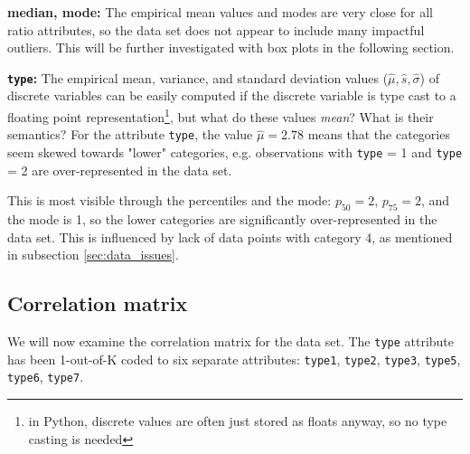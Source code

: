 \textbf{median, mode:} The empirical mean values and modes are very close for all ratio attributes, so the data set does not appear to include many impactful outliers. This will be further investigated with box plots in the following section. 

\textbf{\texttt{type}:} The empirical mean, variance, and standard deviation values ($\hat{\mu}, \hat{s}, \hat{\sigma}$) of discrete variables can be easily computed if the discrete variable is type cast to a floating point representation\footnote{in Python, discrete values are often just stored as floats anyway, so no type casting is needed}, but what do these values \textit{mean}? What is their semantics? For the attribute \texttt{type}, the value $\hat{\mu} = 2.78$ means that the categories seem skewed towards "lower" categories, e.g. observations with \texttt{type} = 1 and \texttt{type} = 2 are over-represented in the data set.

This is most visible through the percentiles and the mode: $p_{50}=2$, $p_{75}=2$, and the mode is 1, so the lower categories are significantly over-represented in the data set. This is influenced by lack of data points with category 4, as mentioned in subsection \ref{sec:data_issues}.

\subsection{Correlation matrix}
\label{sec:CorrMat}

We will now examine the correlation matrix for the data set. The \texttt{type} attribute has been 1-out-of-K coded to six separate attributes: \texttt{type1}, \texttt{type2}, \texttt{type3}, \texttt{type5}, \texttt{type6}, \texttt{type7}.


%

